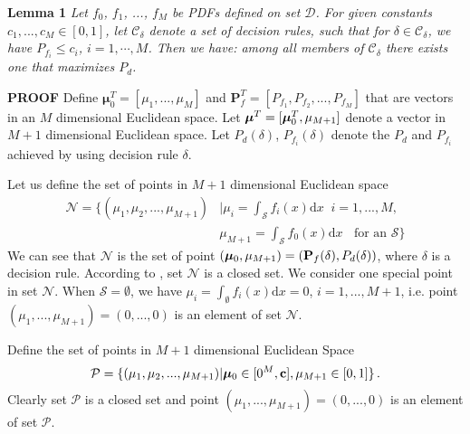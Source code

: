 \noindent \textbf{Lemma 1}
\noindent \textit{Let $f_0$, $f_1$, ..., $f_M$ be PDFs defined on set $\mathcal{D}$. For given constants $c_1, ..., c_M \in [0, 1]$, let $\mathcal{C}_\delta$ denote a set of decision rules,  such that for $\delta \in \mathcal{C}_\delta$, we have $P_{f_i} \leq c_i$, $i = 1, \cdots, M$. Then we have:
 among all members of $\mathcal{C}_\delta$ there exists one that maximizes $P_d$.}

\noindent \textbf{PROOF}
Define $\boldsymbol{\mu}_0^T = [\mu_1, ..., \mu_M]$  and  $\mathbf{P}_f^T = [P_{f_1}, P_{f_2}, ..., P_{f_M}]$ that are vectors in an $M$ dimensional Euclidean  space. Let $\boldsymbol{\mu}^T = [\boldsymbol{\mu}_0^T, \mu_{M+1}]$ denote a vector in $M+1$ dimensional Euclidean space. 
Let $P_d(\delta)$, $P_{f_i}(\delta)$ denote the $P_d$ and $P_{f_i}$ achieved by using decision rule $\delta$.

Let us define the set of points in $M+1$ dimensional Euclidean space
\begin{equation}
\begin{split}
\label{2015apr28a0}
  \mathcal{N} = \{(\mu_1, \mu_2, ..., \mu_{M+1}) &| \mu_i = \int_{\mathcal{S}}f_i(x)\mathrm{d}x \;\;i=1, ..., M,\\
                                            &  \mu_{M+1}=\int_{\mathcal{S}}f_{0}(x)\mathrm{d}x \;\;\text{ for an $\mathcal{S}$}\}
\end{split}
\end{equation}
We can see that $\mathcal{N}$ is the set of point $(\boldsymbol{\mu}_0, \mu_{M+1})=(\mathbf{P}_f(\delta), P_d(\delta))$, where $\delta$ is a decision rule. According to \cite{LehmannTest}, set $\mathcal{N}$ is a closed set. We consider one special point in set $\mathcal{N}$. When $\mathcal{S} = \emptyset$, we have $\mu_i = \int_{\emptyset}f_i(x)\mathrm{d}x = 0$, $i = 1, ..., M+1$, i.e. point $(\mu_1, ..., \mu_{M+1}) = (0, ..., 0)$ is an element of set $\mathcal{N}$.

Define the set of points in $M+1$ dimensional Euclidean Space 
\begin{equation}
\mathcal{P} = \{
(\mu_1, \mu_2, ..., \mu_{M+1}) | \boldsymbol{\mu}_0 \in [0^M, \mathbf{c}], \mu_{M+1} \in [0, 1]
\}\,.
\end{equation}
Clearly set $\mathcal{P}$ is a closed set and point $(\mu_1, ..., \mu_{M+1}) = (0, ..., 0)$ is an element  of set $\mathcal{P}$.


